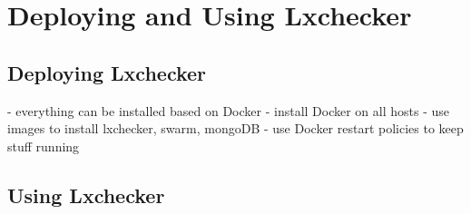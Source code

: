\chapter{Deploying and Using Lxchecker}
\label{chapter:deployment-and-usage}



\section{Deploying Lxchecker}
\label{sec:deployment}

- everything can be installed based on Docker
  - install Docker on all hosts
  - use images to install lxchecker, swarm, mongoDB
  - use Docker restart policies to keep stuff running

\section{Using Lxchecker}
\label{sec:usage}

